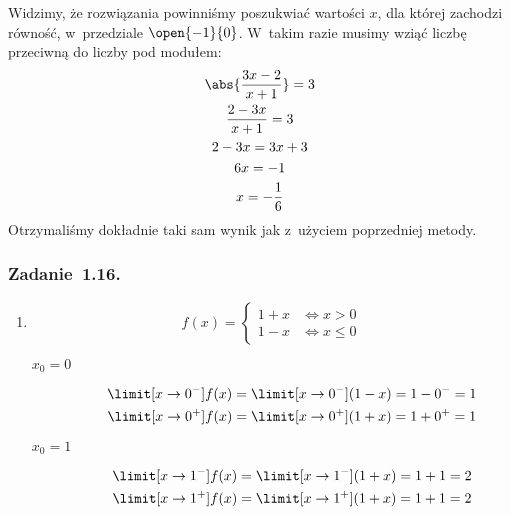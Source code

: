 Widzimy, że rozwiązania powinniśmy poszukwiać wartości \(x\), dla której zachodzi równość, w~przedziale \(\open{-1}{0}\). W~takim razie musimy wziąć liczbę przeciwną do liczby pod modułem:
\begin{gather*}
    \abs{\frac{3x - 2}{x + 1}} = 3\\
    \frac{2 - 3x}{x + 1} = 3\\
    2 - 3x = 3x + 3\\
    6x = -1\\
    x = -\frac{1}{6}
\end{gather*}
Otrzymaliśmy dokładnie taki sam wynik jak z~użyciem poprzedniej metody.
\subsubsection*{Zadanie~1.16.}
\begin{enumerate}[label={\alph*)}]
    \item
        \begin{equation*}
            f(x) = \begin{cases}
                1 + x & \iff x > 0\\
                1 - x & \iff x \leq 0
            \end{cases}
        \end{equation*}
        \begin{description}
            \item[\(x_0 = 0\)]
                \begin{gather*}
                    \limit[x \to 0^-] f(x)
                        = \limit[x \to 0^-] (1 - x)
                        = 1 - 0^-
                        = 1\\
                    \limit[x \to 0^+] f(x)
                        = \limit[x \to 0^+] (1 + x)
                        = 1 + 0^+
                        = 1
                \end{gather*}
            \item[\(x_0 = 1\)]
                \begin{gather*}
                    \limit[x \to 1^{-}] f(x)
                        = \limit[x \to 1^-] (1 + x)
                        = 1 + 1
                        = 2\\
                    \limit[x \to 1^+] f(x)
                        = \limit[x \to 1^+] (1 + x)
                        = 1 + 1
                        = 2
                \end{gather*}
        \end{description}

\end{enumerate}

